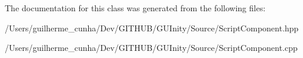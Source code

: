 The documentation for this class was generated from the following files\+:\begin{DoxyCompactItemize}
\item 
/\+Users/guilherme\+\_\+cunha/\+Dev/\+G\+I\+T\+H\+U\+B/\+G\+U\+Inity/\+Source/Script\+Component.\+hpp\item 
/\+Users/guilherme\+\_\+cunha/\+Dev/\+G\+I\+T\+H\+U\+B/\+G\+U\+Inity/\+Source/Script\+Component.\+cpp\end{DoxyCompactItemize}
